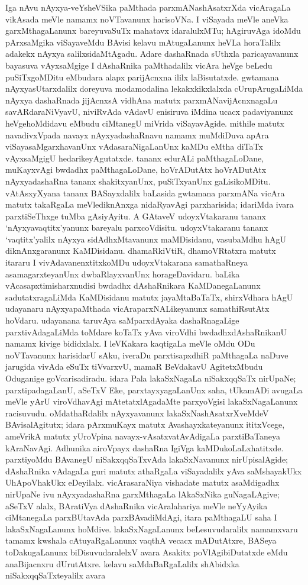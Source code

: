 Iga nAvu nAyxya-veYsheVSika paMthada parxmANashAsatxrXda vicAragaLa vikAsada meVle namamx noVTavanunx harisoVNa. I viSayada meVle aneVka garxMthagaLanunx bareyuvaSuTx mahatavx idaralulxMTu; hAgiruvAga idoMdu pArxsaMgika viSaya\-veMdu BAvisi kelavu mAtugaLanunx heVLa horaTalilx adakekx nAyxya salilxsi\-daMtAgadu. Adare dashaRnada sUthxla paricayavanunx bayasuva vAyxsaMgige I dAshaRnika paMtha\-dalilx vicAra heVge beLedu puSiTxgoMDitu eMbudara alapx parijAcnxna ililx laBisutatxde. gwtamana nAyxyasUtarxdalilx doreyuva modamodalina lekakxkikxlalxda cUrupAru\-gaLiMda nAyxya dashaRnada jijAcnxsA vidhAna matutx parxmANavijAcnxnagaLu savAR\-dara\-NiVyavU, niviRvAda vAdavU enisiruva iMdina ucacx padaviyanunx heVge\break hoMdi\-davu eMbudu ciMtanegU miVrida viSayavAgide. mithile matutx nava\-divxVpada navayx nAyxyadashaRnavu namamx muMdiDuva apAra viSayasaMgarxhavanUnx vAdasaraNigaLanUnx kaMDu eMtha diTaTx vAyxsaMgigU hedarikeyAgutatxde. tananx edu\-rALi paMthagaLoDane, muKayxvAgi bwdadhx paMthagaLoDane, hoVrA\-DutAtx hoVrA\-DutAtx nAyxyadashaRna tananx shakitxyanUnx, puSiTxyanUnx gaLisikoMDitu. vAtAsxyXyana tananx BASayxdalilx baLasida gwtamana parxmANa vicAra matutx takaRgaLa meVle\break diknAnxga nidaRyavAgi parxharisida; idariMda ivara parxtiSeThxge tuMba gAsi\-yAyitu. A GAtaveV udoyxVtakaranu tananx `nAyxyavaqtitx'yanunx bareyalu parxcoVdisitu. udoyxVtakaranu tananx `vaqtitx'yalilx nAyxya sidAdhxMtavanunx maMDisidanu, vasubaMdhu hAgU diknAnxgaranunx KaMDisidanu. dhamaRkiVtiR, dhamoVRtatxra matutx itararu I vivAdavanenxtitxkoMDu udoyxVtakarana samathaRneya asamagarxteyanUnx dwbaRlayx\-vanUnx horageDavidaru. baLika vAcasapxtimisharxnudisi bwdadhx dAshaRnikara KaMDane\-gaLanunx sadutatxragaLiMda KaMDisidanu matutx jayaMtaBaTaTx, shirxVdhara hAgU udayanaru nAyxyapaMthada vicAraparxNALikeyanunx samathiRsutAtx hoVdaru. udayanana taruvAya saMparxdAyaka dashaRnagaLige parxtivAdagaLiMda toMdare koTaTx yAva viroVdhi bwdadhxdAshaRnikanU namamx kivige bididxlalx. I leVKakara kaqtigaLa meVle oMdu ODu noVTavanunx harisidarU sAku, iveraDu parxtisapxdhiR paMthagaLa naDuve jarugida vivAda eSuTx tiVvarxvU, mamaR BeVdakavU AgitetxMbudu Oduganige goVcarisadiradu. idara Pala lakaSxNagaLa niSakxqqSaTx nirUpaNe; parxtipadagaLanU, aSeTxV Eke, parxtayxyagaLanUnx saha, tUkamADi avugaLa meVle yArU viroVdhavAgi mAtetatxlAgadaMte parxyoVgisi lakaSxNagaLanunx racisuvudu. oMdathaRdalilx nAyxyavanunx lakaSxNashAsatxrXveMdeV BAvisalAgitutx; idara pArxmuKayx matutx Avashayxkateyanunx ititxVcege, ameVrikA matutx yUroVpina navayx-vAsatxvatAvAdigaLa parxtiBaTaneya kAraNavAgi. Adhunika airoVpayx dashaRna IgiVga kaMDukoLaLxhatitxde. parxtiyoMdu BAvanegU niSakxqqSaTxvAda lakaSxNavanunx nirUpisalAgide; dAshaRnika vAdagaLa guri matutx athaRgaLa viSayadalilx yAva saMshayakUkx UhApoVhakUkx eDeyilalx. vicArasaraNiya vishadate matutx asaMdigadhx nirUpaNe ivu nAyxyadashaRna garxMthagaLa lAkaSxNika guNagaLAgive; aSeTxV alalx, BAratiVya dAshaRnika vicAralahariya meVle neYyAyika ciMtanegaLa parxBUtavAda parxBAvadiMdAgi, itara paMthagaLU saha I lakaSxNagaLanunx hoMdive. lakaSxNagaLanunx beLesuvudaralilx namamxvaru tamamx kwshala cAtuyaRgaLanunx vaqthA vecacx mADutAtxre, BASeya toDakugaLanunx biDisuvudaralelxV avara Asakitx poVlAgibiDutatxde eMdu anaBijacnxru dUrutAtxre. kelavu saMdaBaRgaLalilx shAbidxka niSakxqqSaTxteyalilx avara 